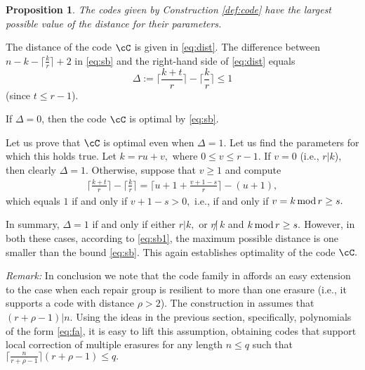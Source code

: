 \documentclass{IEEEtran}
\newtheorem{proposition}[theorem]{Proposition}
\newcounter{construction}[section]
\newcommand{\Mod}[1]{\,\textup{mod}\,#1}
\begin{document}
\vspace*{.1in}
\begin{proposition}
The codes given by Construction \ref{def:code} have the largest possible value of the distance for their parameters.
\end{proposition}
\begin{IEEEproof}
The distance of the code $\cC$ is given in \eqref{eq:dist}. The difference between $n-k-\lceil\frac kr\rceil+2$ in \eqref{eq:sb} and the right-hand side
of \eqref{eq:dist} equals
  $$
  \Delta:=\Big\lceil\frac{k+t}{r}\Big\rceil-\Big\lceil\frac kr\Big\rceil\le 1
  $$
  (since $t\le r-1$).

If $\Delta=0$, then the code $\cC$ is optimal by \eqref{eq:sb}. 

Let us prove that $\cC$ is optimal even when $\Delta=1.$ Let us find the parameters for which this holds true.
Let $k=ru+v,$ where $0\le v\le r-1.$ If $v=0$ (i.e., $r | k$), then clearly $\Delta=1.$ Otherwise, suppose 
that $v\ge 1$ and compute
  \begin{align*}
  \Big\lceil\frac{k+t}{r}\Big\rceil-\Big\lceil\frac kr\Big\rceil
  =\Big\lceil u+1+\frac{v+1-s}{r}\Big\rceil-(u+1),
  \end{align*}
which equals $1$ if and only if $v+1-s>0,$ i.e., if and only if $v=k\Mod r\ge s.$

In summary, $\Delta=1$ if and only if either $r|k,$ or $r \!\!\!\not|\, k$ and $k\Mod r\geq s.$
However, in both these cases, according to \eqref{eq:sb1}, the maximum possible distance 
is one smaller than the bound \eqref{eq:sb}. This again establishes optimality of
the code $\cC.$
\end{IEEEproof}

{\em Remark:}
In conclusion we note that the code family in \cite{OptimalLRC} affords an easy extension to the case when each repair group is resilient to more than one erasure (i.e., it supports a code with distance $\rho>2$). The construction in \cite{OptimalLRC} assumes that
$(r+\rho-1)|n.$ Using the ideas in the previous section, specifically,  polynomials of the form \eqref{eq:fa}, it is easy to lift this 
assumption, obtaining codes that support local correction of multiple erasures for 
any length $n\le q$ such that $\lceil \frac n{r+\rho-1}\rceil(r+\rho-1)\le q.$

{
	
}
\end{document}
